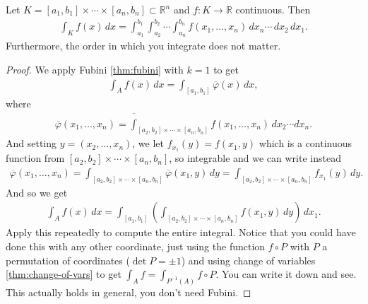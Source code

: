 \begin{corollary}\label{cor:box-fub}
	Let $K = [a_{1}, b_{1}] \times \cdots \times [a_{n}, b_{n}] \subset \mathbb{R}^{n}$ and $f: K \to \mathbb{R}$ continuous. Then
	\begin{align*}
		\int_{K} f(x) \, dx = \int_{a_{1}}^{b_{1}} \int_{a_{2}}^{b_{2}} \cdots \int_{a_{n}}^{b_{n}} f(x_{1}, \dots, x_{n})  \, dx_{n} \cdots   \, d x_{2}  \, d x_{1}.
	\end{align*}
    Furthermore, the order in which you integrate does not matter.
\end{corollary}
\begin{proof}
	We apply Fubini \ref{thm:fubini} with $k = 1$ to get
	\begin{align*}
		\int_{A} f(x) \, dx = \int_{[a_{1}, b_{1}]} \overline{ \varphi }(x)  \, dx,
	\end{align*}
	where
	\begin{align*}
		\overline{ \varphi } (x_{1}, \dots, x_{n}) = \overline{ \int }_{[a_{2}, b_{2}] \times \cdots \times [a_{n}, b_{n}]} f(x_{1}, \dots, x_{n}) \, d x_{2} \cdots dx_{n}.
	\end{align*}
	And setting $y = (x_{2}, \dots, x_{n})$, we let $f_{x_{1}}(y) = f(x_{1}, y)$ which is a continuous function from $[a_{2}, b_{2}] \times \cdots \times [a_{n}, b_{n}]$, so integrable and we can write instead
	\begin{align*}
		\overline{ \varphi } (x_{1}, \dots, x_{n}) = \int_{[a_{2}, b_{2}] \times \cdots \times [a_{n}, b_{n}]} \overline{ \varphi }(x_{1}, y)  \, dy = \int_{[a_{2}, b_{2}] \times \cdots \times [a_{n}, b_{n}]} f_{x_{1}}(y) \, dy.
	\end{align*}
	And so we get
	\begin{align*}
		\int_{A} f(x) \, dx = \int_{[a_{1}, b_{1}]} \left( \int_{[a_{2}, b_{2}] \times \cdots \times [a_{n}, b_{n}]} f(x_{1}, y)  \, dy \right)  \, d x_{1}.
	\end{align*}
	Apply this repeatedly to compute the entire integral. Notice that you could have done this with any other coordinate, just using the function $f \circ P$ with $P$ a permutation of coordinates ($\det P = \pm 1$) and using change of variables \ref{thm:change-of-vars} to get $\int_{A} f = \int_{P^{-1}(A)} f \circ P$. You can write it down and see. This actually holds in general, you don't need Fubini.
\end{proof}

